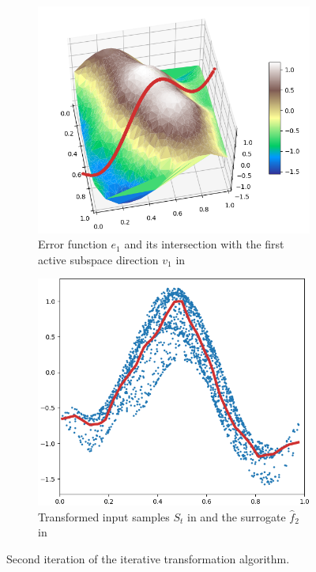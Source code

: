 \documentclass[
  a4paper,  %
  twoside,  %
  bibliography=totoc,
  headsepline,
  cleardoublepage=empty,
  parskip=half,
  draft=false
]{scrbook}
\begin{document}
\begin{mdframed}[style=style]
\begin{figure}[H]
\begin{subfigure}{.5\textwidth}
  \centering
  \includegraphics[width=.85\linewidth]{graphics/pipeline_current_2.png}
  \caption{Error function $e_1$ and its intersection with the first active subspace direction $v_1$ in \reddot}
\label{fig:pipeline_current_2}
\end{subfigure}%
\begin{subfigure}{.5\textwidth}
  \centering
  \includegraphics[width=.85\linewidth]{graphics/pipeline_local_2.png}
  \caption{Transformed input samples $S_t$ in \darkblue and the surrogate $\hat{f}_2$ in \reddot}
\label{fig:pipeline_local_2}
\end{subfigure}
\delimit
\caption{Second iteration of the iterative transformation algorithm.}
\label{fig:pipeline_2}
\end{figure}
\end{mdframed}
\end{document}
